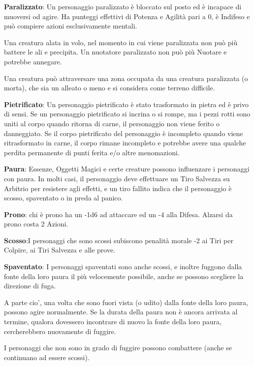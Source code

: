 \documentclass[a4paper,11pt,twoside,openany]{book}
\begin{document}
{\textbf{Paralizzato}: Un personaggio paralizzato è bloccato sul posto ed è incapace di muoversi od agire. Ha punteggi effettivi di Potenza e Agilità pari a 0, è Indifeso e può compiere azioni esclusivamente mentali.

Una creatura alata in volo, nel momento in cui viene paralizzata non può più battere le ali e precipita. 
Un nuotatore paralizzato non può più Nuotare e potrebbe annegare. 

Una creatura può attraversare una zona occupata da una creatura paralizzata (o morta), che sia un alleato o meno e si considera come terreno difficile.

\textbf{Pietrificato}: Un personaggio pietrificato è stato trasformato in pietra ed è privo di sensi. Se un personaggio pietrificato si incrina o si rompe, ma i pezzi rotti sono uniti al corpo quando ritorna di carne, il personaggio non viene ferito o danneggiato. Se il corpo pietrificato del personaggio è incompleto quando viene ritrasformato in carne, il corpo rimane incompleto e potrebbe avere una qualche perdita permanente di punti ferita e/o altre menomazioni.

\textbf{Paura}: Essenze, Oggetti Magici e certe creature possono influenzare i personaggi con paura. In molti casi, il personaggio deve effettuare un Tiro Salvezza su Arbitrio per resistere agli effetti, e un tiro fallito indica che il personaggio è scosso, spaventato o in preda al panico.

\textbf{Prono}: chi è prono ha un -1d6 ad attaccare ed un -4 alla Difesa. Alzarsi da prono costa 2 Azioni.

\textbf{Scosso}:I personaggi che sono scossi subiscono penalità morale -2 ai Tiri per Colpire, ai Tiri Salvezza e alle prove.

\textbf{Spaventato}: I personaggi spaventati sono anche scossi, e inoltre fuggono dalla fonte della loro paura il più velocemente possibile, anche se possono scegliere la direzione di fuga. 

A parte cio', una volta che sono fuori vista (o udito) dalla fonte della loro paura, possono agire normalmente. Se la durata della paura non è ancora arrivata al termine, qualora dovessero incontrare di nuovo la fonte della loro paura, cercherebbero nuovamente di fuggire.

I personaggi che non sono in grado di fuggire possono combattere (anche se continuano ad essere scossi).

}
\end{document}
